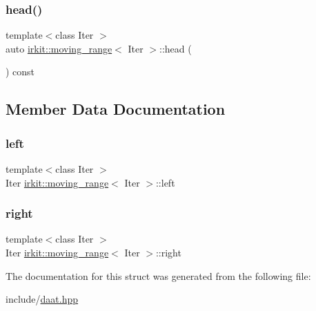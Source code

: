 \mbox{\label{structirkit_1_1moving__range_a4e4c1a83cb13e1ca572275b2c7885aeb}} 
\subsubsection{\texorpdfstring{head()}{head()}}
{\footnotesize\ttfamily template$<$class Iter $>$ \\
auto \hyperlink{structirkit_1_1moving__range}{irkit\+::moving\+\_\+range}$<$ Iter $>$\+::head (\begin{DoxyParamCaption}{ }\end{DoxyParamCaption}) const\hspace{0.3cm}{\ttfamily [inline]}}



\subsection{Member Data Documentation}
\mbox{\label{structirkit_1_1moving__range_a175a0bc6996715ea27e6b87abff03139}} 
\subsubsection{\texorpdfstring{left}{left}}
{\footnotesize\ttfamily template$<$class Iter $>$ \\
Iter \hyperlink{structirkit_1_1moving__range}{irkit\+::moving\+\_\+range}$<$ Iter $>$\+::left}

\mbox{\label{structirkit_1_1moving__range_aa64b16b98bdd7b627ecceb82c8ef3bec}} 
\subsubsection{\texorpdfstring{right}{right}}
{\footnotesize\ttfamily template$<$class Iter $>$ \\
Iter \hyperlink{structirkit_1_1moving__range}{irkit\+::moving\+\_\+range}$<$ Iter $>$\+::right}



The documentation for this struct was generated from the following file\+:\begin{DoxyCompactItemize}
\item 
include/\hyperlink{daat_8hpp}{daat.\+hpp}\end{DoxyCompactItemize}
